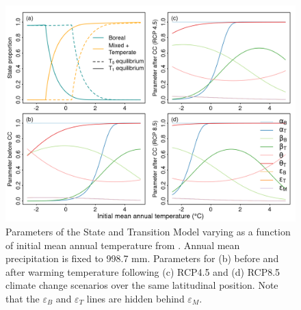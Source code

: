 \hypertarget{fig:sim-result-sup7_ch1}{%
\begin{figure}
\centering
\includegraphics{manuscript/img/num-result_supp2.png}
\caption[{Parameters of the State and Transition Model varying as a
function of initial mean annual temperature from
\citet{Vissault2020}.}]{Parameters of the State and Transition Model
varying as a function of initial mean annual temperature from
\citet{Vissault2020}. Annual mean precipitation is fixed to 998.7 mm.
Parameters for (b) before and after warming temperature following (c)
RCP4.5 and (d) RCP8.5 climate change scenarios over the same latitudinal
position. Note that the \(\varepsilon_B\) and \(\varepsilon_T\) lines
are hidden behind \(\varepsilon_M\).}
\label{fig:sim-result-sup7_ch1}
\end{figure}
}

\newpage

